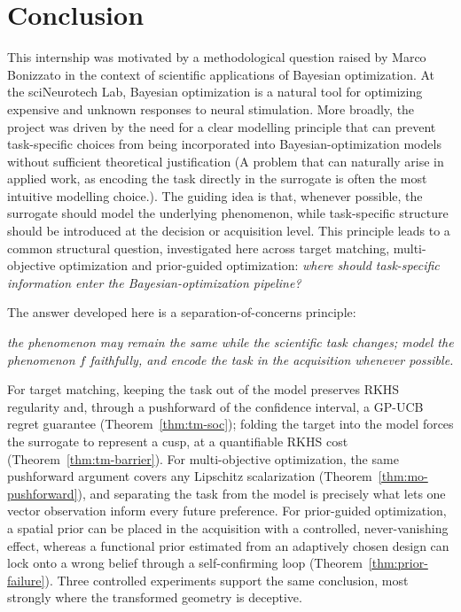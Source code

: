 \section{Conclusion}
\label{sec:conclusion}

This internship was motivated by a methodological question raised by Marco
Bonizzato in the context of scientific applications of Bayesian optimization.
At the sciNeurotech Lab, Bayesian optimization is a natural tool for optimizing
expensive and unknown responses to neural stimulation. More broadly, the project
was driven by the need for a clear modelling principle that can prevent
task-specific choices from being incorporated into Bayesian-optimization models
without sufficient theoretical justification (A problem that can naturally arise in applied work, as encoding the task directly in the surrogate is often the most intuitive modelling choice.). The guiding idea is that, whenever
possible, the surrogate should model the underlying phenomenon, while
task-specific structure should be introduced at the decision or acquisition
level. This principle leads to a common structural question, investigated here
across target matching, multi-objective optimization and prior-guided
optimization: \emph{where should task-specific information enter the
Bayesian-optimization pipeline?}


The answer developed here is a separation-of-concerns principle:
\begin{center}
\emph{the phenomenon may remain the same while the scientific task changes; model
the phenomenon $f$ faithfully, and encode the task in the acquisition whenever
possible.}
\end{center}

For target matching, keeping the task out of the model preserves RKHS regularity
and, through a pushforward of the confidence interval, a GP-UCB regret guarantee
(Theorem~\ref{thm:tm-soc}); folding the target into the model forces the surrogate
to represent a cusp, at a quantifiable RKHS cost (Theorem~\ref{thm:tm-barrier}).
For multi-objective optimization, the same pushforward argument covers any
Lipschitz scalarization (Theorem~\ref{thm:mo-pushforward}), and separating the
task from the model is precisely what lets one vector observation inform every
future preference. For prior-guided optimization, a spatial prior can be placed in
the acquisition with a controlled, never-vanishing effect, whereas a functional
prior estimated from an adaptively chosen design can lock onto a wrong belief
through a self-confirming loop (Theorem~\ref{thm:prior-failure}). Three controlled
experiments support the same conclusion, most strongly where the transformed
geometry is deceptive.

